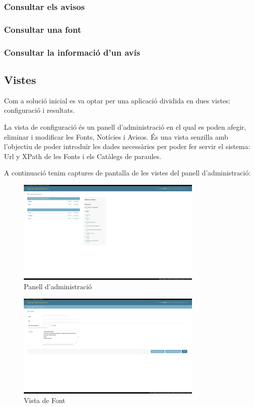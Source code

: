 \documentclass{article}
\begin{document}
\subsubsection{Consultar els avisos}
\subsubsection{Consultar una font}
\subsubsection{Consultar la informació d'un avís}


\newpage

\subsection{Vistes}

Com a solució inicial es va optar per una aplicació dividida en dues vistes: configuració i resultats.

La vista de configuració és un panell d'administració en el qual es poden afegir, eliminar i modificar les Fonts, Notícies i Avisos. És una vista senzilla amb l'objectiu de poder introduïr les dades necessàries per poder fer servir el sistema: Url y XPath de les Fonts i els Catàlegs de paraules.

A continuació tenim captures de pantalla de les vistes del panell d'administració:

\begin{figure}[!ht]
    \centering
    \includegraphics[width=0.8\textwidth]{adminpanel.png}
    \caption{Panell d'administració}
\end{figure}

\begin{figure}[!ht]
    \centering
    \includegraphics[width=0.8\textwidth]{addfont.png}
    \caption{Vista de Font}
\end{figure}
\end{document}
